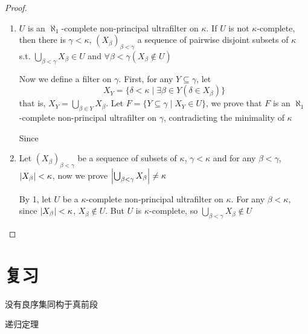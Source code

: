 \documentclass[11pt]{article}
\begin{document}
\begin{proof}
\begin{enumerate}
\item \(U\) is an \(\aleph_1\)-complete non-principal ultrafilter on \(\kappa\). If \(U\) is not \(\kappa\)-complete, then
there is \(\gamma<\kappa\), \((X_\beta)_{\beta<\gamma}\) a sequence of pairwise disjoint subsets of \(\kappa\)
s.t. \(\bigcup_{\beta<\gamma}X_\beta\in U\) and \(\forall\beta<\gamma(X_\beta\notin U)\)

Now we define a filter on \(\gamma\). First, for any \(Y\subseteq\gamma\), let
\begin{equation*}
X_Y=\{\delta<\kappa\mid\exists\beta\in Y(\delta\in X_\beta)\}
\end{equation*}
that is, \(X_Y=\bigcup_{\beta\in Y}X_\beta\). Let \(F=\{Y\subseteq\gamma\mid X_Y\in U\}\), we prove that \(F\) is
an \(\aleph_1\)-complete non-principal ultrafilter on \(\gamma\), contradicting the minimality of \(\kappa\)

Since

\item Let \((X_\beta)_{\beta<\gamma}\) be a sequence of subsets of \(\kappa\), \(\gamma<\kappa\) and for
any \(\beta<\gamma\), \(\abs{X_\beta}<\kappa\), now we prove \(\abs{\bigcup_{\beta<\gamma}X_\beta}\neq\kappa\)

By 1, let \(U\) be a \(\kappa\)-complete non-principal ultrafilter on \(\kappa\). For any \(\beta<\kappa\),
since \(\abs{X_\beta}<\kappa\), \(X_\beta\notin U\). But \(U\) is \(\kappa\)-complete, so \(\bigcup_{\beta<\gamma}X_\beta\notin U\)
\end{enumerate}
\end{proof}

\section{复习}
\label{sec:org8ffbf10}
没有良序集同构于真前段

递归定理
\end{document}
